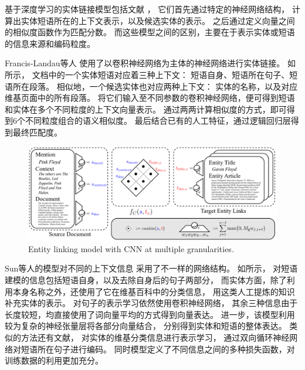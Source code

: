 基于深度学习的实体链接模型包括文献
\parencite{francis2016capturing,sun2015modeling,gupta2017entity,fang2016entity}，
它们首先通过特定的神经网络结构，
计算出实体短语所在的上下文表示，以及候选实体的表示。
之后通过定义向量之间的相似度函数作为匹配分数。
而这些模型之间的区别，主要在于表示实体或短语的信息来源和编码粒度。


Francis-Landau等人\cite{francis2016capturing}
使用了以卷积神经网络为主体的神经网络进行实体链接。
如所示，
文档中的一个实体短语对应着三种上下文：
短语自身、短语所在句子、短语所在段落。
相似地，一个候选实体也对应两种上下文：
实体的名称，以及对应维基页面中的所有段落。
将它们输入至不同参数的卷积神经网络，便可得到短语和实体在多个不同粒度的上下文向量表示。
通过两两计算相似度的方式，即可得到6个不同粒度组合的语义相似度。
最后结合已有的人工特征，通过逻辑回归层得到最终匹配度。

\begin{figure}[th]
	\centering
    \includegraphics[width=0.95\columnwidth]{figure/rw/linking-francis.png}
    {Entity linking model with CNN at multiple granularities.}
	\label{fig:rw-linking-francis}
\end{figure}


Sun等人\cite{sun2015modeling}的模型对不同的上下文信息
采用了不一样的网络结构。
如所示，
对短语建模的信息包括短语自身，以及去除自身后的句子两部分，
而实体方面，除了利用本身名称之外，还使用了它在维基百科中的分类信息，
用这类人工提炼的知识补充实体的表示。
对句子的表示学习依然使用卷积神经网络，
其余三种信息由于长度较短，均直接使用了词向量平均的方式得到向量表达。
进一步，该模型利用较为复杂的神经张量层将各部分向量结合，
分别得到实体和短语的整体表达。
类似的方法还有文献\parencite{gupta2017entity}，
对实体的维基分类信息进行表示学习，
通过双向循环神经网络对短语所在句子进行编码。
同时模型定义了不同信息之间的多种损失函数，对训练数据的利用更加充分。

